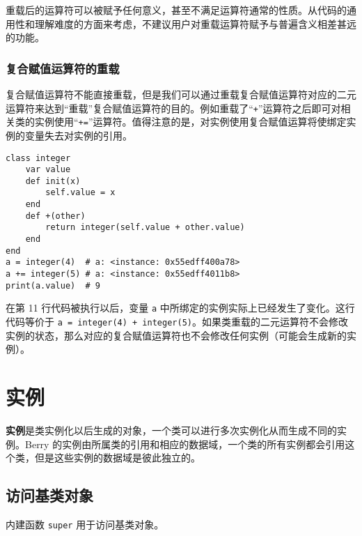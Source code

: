 重载后的运算符可以被赋予任何意义，甚至不满足运算符通常的性质。从代码的通用性和理解难度的方面来考虑，不建议用户对重载运算符赋予与普遍含义相差甚远的功能。

\subsubsection{复合赋值运算符的重载}

复合赋值运算符不能直接重载，但是我们可以通过重载复合赋值运算符对应的二元运算符来达到“重载”复合赋值运算符的目的。例如重载了``\texttt{+}''运算符之后即可对相关类的实例使用``\texttt{+=}''运算符。值得注意的是，对实例使用复合赋值运算将使绑定实例的变量失去对实例的引用。
\begin{lstlisting}[language=berry]
class integer
    var value
    def init(x)
        self.value = x
    end
    def +(other)
        return integer(self.value + other.value)
    end
end
a = integer(4)  # a: <instance: 0x55edff400a78>
a += integer(5) # a: <instance: 0x55edff4011b8>
print(a.value)  # 9
\end{lstlisting}

在第 11 行代码被执行以后，变量 \texttt{a} 中所绑定的实例实际上已经发生了变化。这行代码等价于 \texttt{a = integer(4) + integer(5)}。如果类重载的二元运算符不会修改实例的状态，那么对应的复合赋值运算符也不会修改任何实例（可能会生成新的实例）。

\section{实例}

\textbf{实例}是类实例化以后生成的对象，一个类可以进行多次实例化从而生成不同的实例。Berry 的实例由所属类的引用和相应的数据域，一个类的所有实例都会引用这个类，但是这些实例的数据域是彼此独立的。

\subsection{访问基类对象}

内建函数 \texttt{super} 用于访问基类对象。
